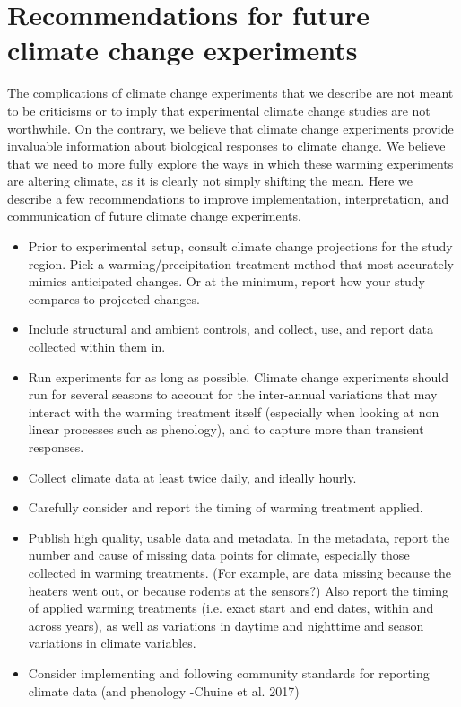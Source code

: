 \documentclass{article}
\begin{document}
\section {Recommendations for future climate change experiments}
 \par The complications of climate change experiments that  we describe are not meant to be criticisms or to imply that experimental climate change studies are not worthwhile. On the contrary, we believe that climate change experiments provide invaluable information about biological responses to climate change.
 We believe that we need to more fully explore the ways in which these warming experiments are altering climate, as it is clearly not simply shifting the mean. Here we describe a few recommendations to improve implementation, interpretation, and communication of future climate change experiments.
\begin{itemize}

\item Prior to experimental setup, consult climate change projections for the study region.  Pick a warming/precipitation treatment method that most accurately mimics anticipated changes. Or at the minimum, report how your study compares to projected changes. 
\item Include structural and ambient controls, and collect, use, and report data collected within them in. 
\item Run experiments for as long as possible. Climate change experiments should run for several seasons to account for the inter-annual variations that may interact with the warming treatment itself (especially when looking at non linear processes such as phenology), and to capture more than transient responses.
 \item Collect climate data at least twice daily, and ideally hourly. 
\item Carefully consider and report the timing of warming treatment applied.
 \item Publish high quality, usable data and metadata. In the metadata, report the number and cause of missing data points for climate, especially those collected in warming treatments. (For example, are data missing because the heaters went out, or because rodents at the sensors?) Also report the timing of applied warming treatments (i.e. exact start and end dates, within and across years), as well as variations in daytime and nighttime and season variations in climate variables. 
\item Consider implementing and following community standards for reporting climate data (and phenology -Chuine et al. 2017) %

 \end{itemize}
\end{document}
